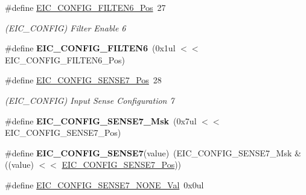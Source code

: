 \begin{DoxyCompactItemize}
\item 
\hypertarget{group___s_a_m_l21___e_i_c_ga1138acbe8b4dedc40a413a58ec7b2c57}{}\#define \hyperlink{group___s_a_m_l21___e_i_c_ga1138acbe8b4dedc40a413a58ec7b2c57}{E\+I\+C\+\_\+\+C\+O\+N\+F\+I\+G\+\_\+\+F\+I\+L\+T\+E\+N6\+\_\+\+Pos}~27\label{group___s_a_m_l21___e_i_c_ga1138acbe8b4dedc40a413a58ec7b2c57}

\begin{DoxyCompactList}\small\item\em (E\+I\+C\+\_\+\+C\+O\+N\+F\+I\+G) Filter Enable 6 \end{DoxyCompactList}\item 
\hypertarget{group___s_a_m_l21___e_i_c_gaa478e221fcdc48e552b61567e53ad83f}{}\#define {\bfseries E\+I\+C\+\_\+\+C\+O\+N\+F\+I\+G\+\_\+\+F\+I\+L\+T\+E\+N6}~(0x1ul $<$$<$ E\+I\+C\+\_\+\+C\+O\+N\+F\+I\+G\+\_\+\+F\+I\+L\+T\+E\+N6\+\_\+\+Pos)\label{group___s_a_m_l21___e_i_c_gaa478e221fcdc48e552b61567e53ad83f}

\item 
\hypertarget{group___s_a_m_l21___e_i_c_ga19583c715708b15f578f5cc2a8f394fc}{}\#define \hyperlink{group___s_a_m_l21___e_i_c_ga19583c715708b15f578f5cc2a8f394fc}{E\+I\+C\+\_\+\+C\+O\+N\+F\+I\+G\+\_\+\+S\+E\+N\+S\+E7\+\_\+\+Pos}~28\label{group___s_a_m_l21___e_i_c_ga19583c715708b15f578f5cc2a8f394fc}

\begin{DoxyCompactList}\small\item\em (E\+I\+C\+\_\+\+C\+O\+N\+F\+I\+G) Input Sense Configuration 7 \end{DoxyCompactList}\item 
\hypertarget{group___s_a_m_l21___e_i_c_ga02110a1b2861cc0350c98fc35963c3a6}{}\#define {\bfseries E\+I\+C\+\_\+\+C\+O\+N\+F\+I\+G\+\_\+\+S\+E\+N\+S\+E7\+\_\+\+Msk}~(0x7ul $<$$<$ E\+I\+C\+\_\+\+C\+O\+N\+F\+I\+G\+\_\+\+S\+E\+N\+S\+E7\+\_\+\+Pos)\label{group___s_a_m_l21___e_i_c_ga02110a1b2861cc0350c98fc35963c3a6}

\item 
\hypertarget{group___s_a_m_l21___e_i_c_ga65967e0d923c427a2dbebafb0dd5238b}{}\#define {\bfseries E\+I\+C\+\_\+\+C\+O\+N\+F\+I\+G\+\_\+\+S\+E\+N\+S\+E7}(value)~(E\+I\+C\+\_\+\+C\+O\+N\+F\+I\+G\+\_\+\+S\+E\+N\+S\+E7\+\_\+\+Msk \& ((value) $<$$<$ \hyperlink{group___s_a_m_l21___e_i_c_ga19583c715708b15f578f5cc2a8f394fc}{E\+I\+C\+\_\+\+C\+O\+N\+F\+I\+G\+\_\+\+S\+E\+N\+S\+E7\+\_\+\+Pos}))\label{group___s_a_m_l21___e_i_c_ga65967e0d923c427a2dbebafb0dd5238b}

\item 
\hypertarget{group___s_a_m_l21___e_i_c_gad238f5412dacf421dc698fbb1e6be2f2}{}\#define \hyperlink{group___s_a_m_l21___e_i_c_gad238f5412dacf421dc698fbb1e6be2f2}{E\+I\+C\+\_\+\+C\+O\+N\+F\+I\+G\+\_\+\+S\+E\+N\+S\+E7\+\_\+\+N\+O\+N\+E\+\_\+\+Val}~0x0ul\label{group___s_a_m_l21___e_i_c_gad238f5412dacf421dc698fbb1e6be2f2}


\end{DoxyCompactItemize}
